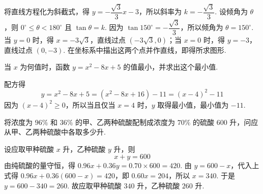 \begin{solution}
将直线方程化为斜截式，得
\(y=-\dfrac{\sqrt{3}}{3}x-3\)，所以斜率为 \(k=-\dfrac{\sqrt{3}}{3}\).
设倾角为 \(\theta\)，则 \(0^\circ\leq\theta<180^\circ\) 且 \(\tan\theta=k\).
因为 \(\tan150^\circ=-\dfrac{\sqrt{3}}{3}\)，所以倾角为 \(\theta=150^\circ\).
当 \(y=0\) 时，得 \(x=-3\sqrt{3}\)，直线过点 \((-3\sqrt{3},0)\)；当 \(x=0\) 时，得 \(y=-3\)，直线过点 \((0,-3)\). 在坐标系中描出这两个点并作直线，即得所求图形.
\end{solution}

\begin{problem}
当 \(x\) 为何值时，函数 \(y=x^2-8x+5\) 的值最小，并求出这个最小值.
\end{problem}

\begin{solution}
配方得
\[
y=x^2-8x+5=(x^2-8x+16)-11=(x-4)^2-11
\]
因为 \((x-4)^2\geq0\)，所以当且仅当 \(x=4\) 时，\(y\) 取得最小值，最小值为 \(-11\).
\end{solution}

\begin{problem}
将浓度为 \(96\%\) 和 \(36\%\) 的甲、乙两种硫酸配制成浓度为 \(70\%\) 的硫酸 \(600\text{ 升}\)，问应从甲、乙两种硫酸中各取多少升.
\end{problem}

\begin{solution}
设应取甲种硫酸 \(x\text{ 升}\)，乙种硫酸 \(y\text{ 升}\)，则
\[
x+y=600
\]
由纯硫酸的量守恒，得 \(0.96x+0.36y=0.70\times600=420\). 由 \(y=600-x\)，代入上式得
\(0.96x+0.36(600-x)=420\)，即
\(0.60x=204\)，所以 \(x=340\).
于是 \(y=600-340=260\).
故应取甲种硫酸 \(340\text{ 升}\)，乙种硫酸 \(260\text{ 升}\).
\end{solution}

